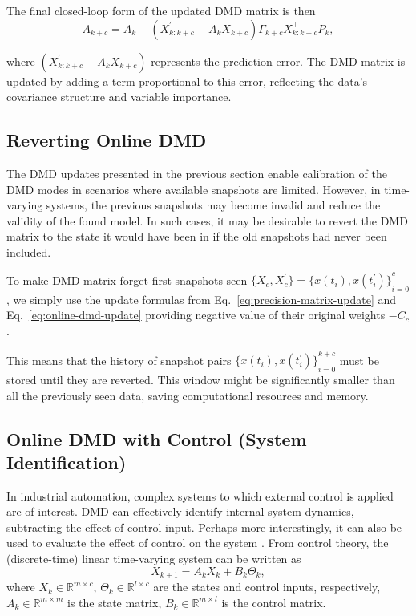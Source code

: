 The final closed-loop form of the updated DMD matrix is then
\begin{equation}\label{eq:online-dmd-update}
	A_{k+c} = A_k + (X^\prime_{k : k+c} - A_k X_{k+c}) \Gamma_{k+c} X_{k : k+c}^\top P_k,
\end{equation}

where \((X^\prime_{k : k+c} - A_k X_{k+c})\) represents the prediction error. The DMD matrix is updated by adding a term proportional to this error, reflecting the data's covariance structure and variable importance.

\subsection{Reverting Online DMD}
The DMD updates presented in the previous section enable calibration of the DMD modes in scenarios where available snapshots are limited. However, in time-varying systems, the previous snapshots may become invalid and reduce the validity of the found model. In such cases, it may be desirable to revert the DMD matrix to the state it would have been in if the old snapshots had never been included.

To make DMD matrix forget first snapshots seen \( \{X_{c}, X^\prime_{c}\} = {\{x(t_i), x(t_i^\prime )\}}^c_{i=0}\), we simply use the update formulas from Eq.~\eqref{eq:precision-matrix-update} and Eq.~\eqref{eq:online-dmd-update} providing negative value of their original weights \(-C_{c}\).

This means that the history of snapshot pairs \({\{x(t_i), x(t_i^\prime )\}}^{k+c}_{i=0}\) must be stored until they are reverted. This window might be significantly smaller than all the previously seen data, saving computational resources and memory.


\subsection{Online DMD with Control (System Identification)}
In industrial automation, complex systems to which external control is applied are of interest. DMD can effectively identify internal system dynamics, subtracting the effect of control input. Perhaps more interestingly, it can also be used to evaluate the effect of control on the system \citep{Proctor2016}. From control theory, the (discrete-time) linear time-varying system can be written as
\begin{equation}\label{eq:linear-system}
	X_{k+1} = A_k X_{k} + B_k \Theta_{k},
\end{equation}
where \(X_k \in \mathbb{R}^{m \times c}\), \(\Theta_k \in \mathbb{R}^{l \times c}\) are the states and control inputs, respectively, \(A_k \in \mathbb{R}^{m \times m}\) is the state matrix, \(B_k \in \mathbb{R}^{m \times l}\) is the control matrix.

